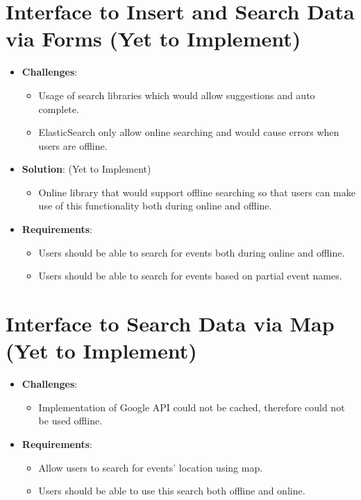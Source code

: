 \documentclass[11pt, a4paper]{article}
\begin{document}
\section{Interface to Insert and Search Data via Forms (Yet to Implement)}
\begin{itemize}
  \item \textbf{Challenges}: 
  \begin{itemize}
    \item Usage of search libraries which would allow suggestions and auto complete. 
    \item ElasticSearch only allow online searching and would cause errors when users are offline.
  \end{itemize}
  \item \textbf{Solution}: (Yet to Implement)
  \begin{itemize}
    \item Online library that would support offline searching so that users can make use of this 
    functionality both during online and offline.
  \end{itemize}
  \item \textbf{Requirements}: 
  \begin{itemize}
    \item Users should be able to search for events both during online and offline.
    \item Users should be able to search for events based on partial event names.
  \end{itemize}
\end{itemize}

\section{Interface to Search Data via Map (Yet to Implement)}
\begin{itemize}
  \item \textbf{Challenges}:
  \begin{itemize}
    \item Implementation of Google API could not be cached, therefore could not be used offline. 
  \end{itemize}
  \item \textbf{Requirements}: 
  \begin{itemize}
    \item Allow users to search for events' location using map.
    \item Users should be able to use this search both offline and online.
  \end{itemize}
\end{itemize}
\end{document}
